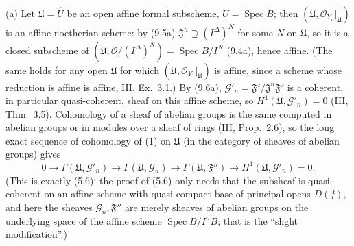 \documentclass[11pt]{article}
\begin{document}
(a) Let $\mathfrak U=\widehat U$ be an open affine formal subscheme, $U=\operatorname{Spec}B$; then $(\mathfrak U,\mathcal O_{Y_n}|_{\mathfrak U})$ is an affine noetherian scheme: by (9.5a) $\mathfrak J^n\supseteq(I^\Delta)^N$ for some $N$ on $\mathfrak U$, so it is a closed subscheme of $(\mathfrak U,\mathcal O/(I^\Delta)^N)=\operatorname{Spec}B/I^N$ (9.4a), hence affine. (The same holds for any open $\mathfrak U$ for which $(\mathfrak U,\mathcal O_{Y_1}|_{\mathfrak U})$ is affine, since a scheme whose reduction is affine is affine, III, Ex.~3.1.) By (9.6a), $\mathcal G'_n=\mathfrak F'/\mathfrak J^n\mathfrak F'$ is a coherent, in particular quasi-coherent, sheaf on this affine scheme, so $H^1(\mathfrak U,\mathcal G'_n)=0$ (III, Thm.~3.5). Cohomology of a sheaf of abelian groups is the same computed in abelian groups or in modules over a sheaf of rings (III, Prop.~2.6), so the long exact sequence of cohomology of (1) on $\mathfrak U$ (in the category of sheaves of abelian groups) gives
\[0\to\Gamma(\mathfrak U,\mathcal G'_n)\to\Gamma(\mathfrak U,\mathcal G_n)\to\Gamma(\mathfrak U,\mathfrak F'')\to H^1(\mathfrak U,\mathcal G'_n)=0.\]
(This is exactly (5.6): the proof of (5.6) only needs that the subsheaf is quasi-coherent on an affine scheme with quasi-compact base of principal opens $D(f)$, and here the sheaves $\mathcal G_n,\mathfrak F''$ are merely sheaves of abelian groups on the underlying space of the affine scheme $\operatorname{Spec}B/I^nB$; that is the ``slight modification''.)
\end{document}
